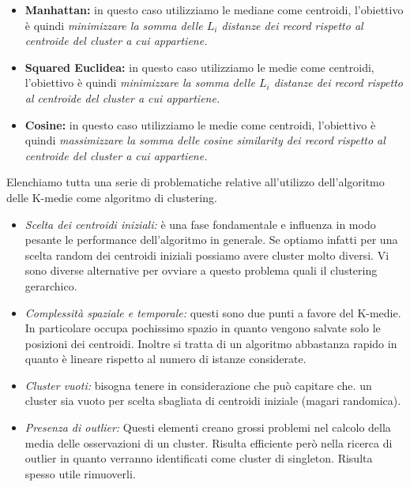 \begin{itemize}
	\item \textbf{Manhattan:} in questo caso utilizziamo le mediane come centroidi, l'obiettivo è quindi \textit{minimizzare la somma delle $L_{i}$ distanze dei record rispetto al centroide del cluster a cui appartiene.}
	\item \textbf{Squared Euclidea:} in questo caso utilizziamo le medie come centroidi, l'obiettivo è quindi \textit{minimizzare la somma delle $L_{i}$ distanze dei record rispetto al centroide del cluster a cui appartiene.}
	\item \textbf{Cosine:} in questo caso utilizziamo le medie come centroidi, l'obiettivo è quindi \textit{massimizzare la somma delle cosine similarity dei record rispetto al centroide del cluster a cui appartiene.}
\end{itemize}


Elenchiamo tutta una serie di problematiche relative all'utilizzo dell'algoritmo delle K-medie come algoritmo di clustering.
\begin{itemize}
	\item\textit{Scelta dei centroidi iniziali:} è una fase fondamentale e influenza in modo pesante le performance dell'algoritmo in generale. Se optiamo infatti per una scelta random dei centroidi iniziali possiamo avere cluster molto diversi. Vi sono diverse alternative per ovviare a questo problema quali il clustering gerarchico.
	\item \textit{Complessità spaziale e temporale:} questi sono due punti a favore del K-medie. In particolare occupa pochissimo spazio in quanto vengono salvate solo le posizioni dei centroidi. Inoltre si tratta di un algoritmo abbastanza rapido in quanto è lineare rispetto al numero di istanze considerate. 
	\item \textit{Cluster vuoti:} bisogna tenere in considerazione che può capitare che. un cluster sia vuoto per scelta sbagliata di centroidi iniziale (magari randomica).
	\item \textit{Presenza di outlier:} Questi elementi creano grossi problemi nel calcolo della media delle osservazioni di un cluster. Risulta efficiente però nella ricerca di outlier in quanto verranno identificati come cluster di singleton. Risulta spesso utile rimuoverli.
\end{itemize}

